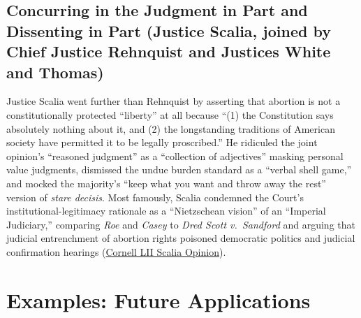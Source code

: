 \documentclass[12pt]{article}
\begin{document}
\subsection{Concurring in the Judgment in Part and Dissenting in Part (Justice Scalia, joined by Chief Justice Rehnquist and Justices White and Thomas)}

Justice Scalia went further than Rehnquist by asserting that abortion is not a constitutionally protected ``liberty'' at all because ``(1) the Constitution says absolutely nothing about it, and (2) the longstanding traditions of American society have permitted it to be legally proscribed.'' He ridiculed the joint opinion's ``reasoned judgment'' as a ``collection of adjectives'' masking personal value judgments, dismissed the undue burden standard as a ``verbal shell game,'' and mocked the majority's ``keep what you want and throw away the rest'' version of \textit{stare decisis}. Most famously, Scalia condemned the Court's institutional-legitimacy rationale as a ``Nietzschean vision'' of an ``Imperial Judiciary,'' comparing \textit{Roe} and \textit{Casey} to \textit{Dred Scott v.\ Sandford} and arguing that judicial entrenchment of abortion rights poisoned democratic politics and judicial confirmation hearings (\href{https://www.law.cornell.edu/supct/html/91-744.ZX4.html}{Cornell LII Scalia Opinion}).

\section{Examples: Future Applications}
\end{document}
